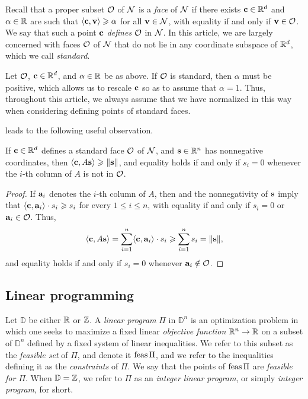 \documentclass[11pt]{amsart}
\begin{document}
Recall that a proper subset $\mathcal{O}$ of $\mathcal{N}$ is a \emph{face} of $\mathcal{N}$ if there exists $\mathbf{c} \in \mathbb{R}^d$ and $\alpha \in \mathbb{R}$ are such that $\langle \mathbf{c}, \mathbf{v} \rangle \geqslant \alpha$ for all $\mathbf{v} \in \mathcal{N}$, with equality if and only if $\mathbf{v} \in \mathcal{O}$.
We say that such a point $\mathbf{c}$ \emph{defines} $\mathcal{O}$ in $\mathcal{N}$.  In this article, we are largely concerned with faces $\mathcal{O}$ of $\mathcal{N}$ that do not lie in any coordinate subspace of $\mathbb{R}^d$, which we call \emph{standard}.

\begin{convention}
\label{alpha=1: convention}
Let $\mathcal{O}$, $\mathbf{c} \in \mathbb{R}^d$, and $\alpha \in \mathbb{R}$ be as above.  If $\mathcal{O}$ is standard, then $\alpha$ must be positive, which allows us to rescale $\mathbf{c}$ so as to assume that $\alpha = 1$.   Thus, throughout this article, we always assume that we have normalized in this way when considering defining points of standard faces.
\end{convention}

 leads to the following useful observation.

\begin{proposition}\label{prop: inner product with columns of A}
   If $\mathbf{c} \in \mathbb{R}^d$ defines a standard face $\mathcal{O}$ of $\mathcal{N}$, and $\mathbf{s} \in \mathbb{R}^n$ has nonnegative coordinates, then $\langle \mathbf{c}, A\mathbf{s} \rangle \geqslant \| \mathbf{s} \|$,  and equality holds if and only if $s_i = 0$ whenever the $i$-th column of $A$ is not in $\mathcal{O}$. 
\end{proposition}

\begin{proof}
If $\mathbf{a}_i$ denotes the $i$-th column of $A$, then  and the nonnegativity of $\mathbf{s}$ imply that $\langle \mathbf{c}, \mathbf{a}_i \rangle \cdot s_i \geqslant s_i$ for every $1 \leq i \leq n$, with equality if and only if $s_i = 0$ or $\mathbf{a}_i \in \mathcal{O}$.
Thus,
\[ \langle \mathbf{c}, A\mathbf{s} \rangle = \sum_{i=1}^n \langle \mathbf{c}, \mathbf{a}_i \rangle \cdot s_i \geqslant  \sum_{i=1}^n s_i  = \| \mathbf{s} \|,\]
and equality holds if and only if $s_i = 0$ whenever $\mathbf{a}_i \notin \mathcal{O}$.
\end{proof}

\subsection{Linear programming}  

Let $\mathbb{D}$ be either $\mathbb{R}$ or $\mathbb{Z}$.
A \emph{linear program} $\Pi$ in $\mathbb{D}^n$ is an optimization problem in which one seeks to maximize a fixed linear \emph{objective function} $\mathbb{R}^n \to \mathbb{R}$ on a subset of $\mathbb{D}^n$ defined by a fixed system of linear inequalities.
We refer to this subset as the \emph{feasible set} of $\Pi$, and denote it $\operatorname{feas} \Pi$, and we refer to the inequalities defining it as the \emph{constraints} of $\Pi$.
We say that the points of $\operatorname{feas} \Pi$ are \emph{feasible for $\Pi$}.
When $\mathbb{D} = \mathbb{Z}$, we refer to $\Pi$ as an \emph{integer linear program}, or simply \emph{integer program}, for short.  
\end{document}
